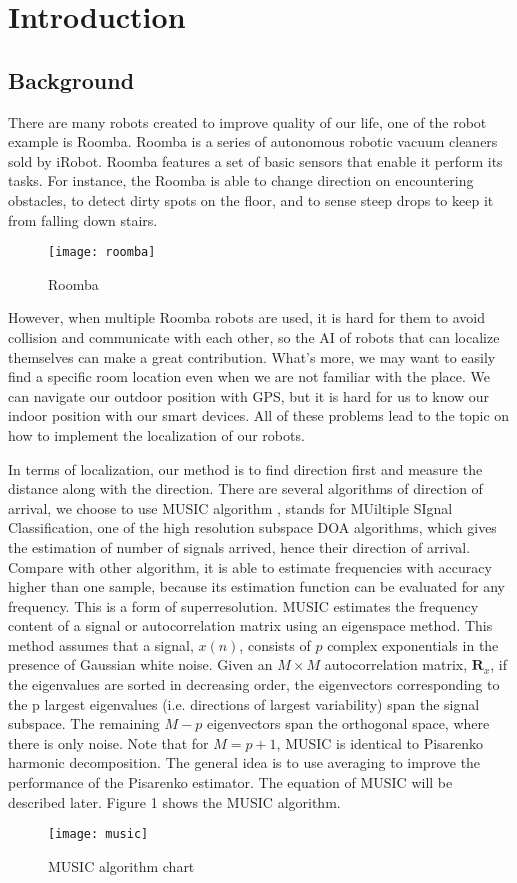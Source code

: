 \section{Introduction}
\label{sec:introduction}
\subsection{Background}
	There are many robots created to improve quality of our life, one of the robot example is Roomba. Roomba is a series of autonomous robotic vacuum cleaners sold by iRobot. Roomba features a set of basic sensors that enable it perform its tasks. For instance, the Roomba is able to change direction on encountering obstacles, to detect dirty spots on the floor, and to sense steep drops to keep it from falling down stairs. \cite{wiki:Roomba} 
	\begin{figure}[ht]
	\centering
	\texttt{[image: roomba]}
	\caption{Roomba}
	\end{figure}
	\par
	However, when multiple Roomba robots are used, it is hard for them to avoid collision and communicate with each other, so the AI of robots that can localize themselves can make a great contribution. What's more, we may want to easily find a specific room location even when we are not familiar with the place.  We can navigate our outdoor position with GPS, but it is hard for us to know our indoor position with our smart devices. All of these problems lead to the topic on how to implement the localization of our robots.
\par
	In terms of localization, our method is to find direction first and measure the distance along with the direction. There are several algorithms of direction of arrival, we choose to use MUSIC algorithm , stands for MUiltiple SIgnal Classification, one of the high resolution subspace DOA algorithms, which gives the estimation of number of signals arrived, hence their direction of arrival. Compare with other algorithm, it is able to estimate frequencies with accuracy higher than one sample, because its estimation function can be evaluated for any frequency. This is a form of superresolution. MUSIC estimates the frequency content of a signal or autocorrelation matrix using an eigenspace method. This method assumes that a signal, $x(n)$, consists of $p$ complex exponentials in the presence of Gaussian white noise. Given an $M \times M$ autocorrelation matrix, $\mathbf{R}_x$, if the eigenvalues are sorted in decreasing order, the eigenvectors corresponding to the p largest eigenvalues (i.e. directions of largest variability) span the signal subspace. The remaining $M-p$ eigenvectors span the orthogonal space, where there is only noise. Note that for $M = p + 1$, MUSIC is identical to Pisarenko harmonic decomposition. The general idea is to use averaging to improve the performance of the Pisarenko estimator. The equation of MUSIC will be described later. Figure 1 shows the MUSIC algorithm. \cite{wiki:MUSIC} \cite{music}
	\begin{figure}[ht]
	\centering
	\texttt{[image: music]}
	\caption{MUSIC algorithm chart}
	\end{figure}
	

